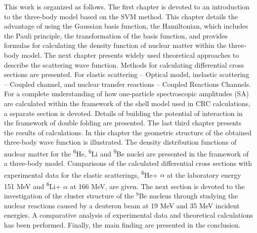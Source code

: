 \documentclass[
12pt, %
oneside, %
english, %
onehalfspacing, %
onehalfspacing, %
headsepline, %
]{MastersDoctoralThesis} %
\newcommand{\he}{\textsuperscript{6}He\xspace}
\newcommand{\li}{\textsuperscript{6}Li\xspace}
\newcommand{\be}{\textsuperscript{9}Be\xspace}
\begin{document}
This work is organized as follows. The first chapter is devoted to an introduction to the three-body model based on the SVM method. This chapter details the advantage of using the Gaussian basis function, the Hamiltonian, which includes the Pauli principle, the transformation of the basis function, and provides formulas for calculating the density function of nuclear matter within the three-body model. 
The next chapter presents widely used theoretical approaches to describe the scattering wave function. 
Methods for calculating differential cross sections  are presented. For elastic scattering -- Optical model, inelastic scattering -- Coupled channel, and nuclear transfer reactions -- Coupled Reactions Channels. 
For a complete understanding of how one-particle spectroscopic amplitudes (SA) are calculated within the framework of the shell model used in CRC calculations, a separate section is devoted.
Details of building the potential of interaction in the framework of double folding are presented.
The last third chapter presents the results of calculations. 
In this chapter the geometric structure of the obtained three-body wave function is illustrated. 
The density distribution functions of nuclear matter for the \he, \li and \be nuclei are presented in the framework of a three-body model. 
Comparisons of the calculated differential cross sections with experimental data for the elastic scatterings, \he + $\alpha$ at the laboratory energy 151 MeV  and \li + $\alpha$ at 166 MeV, are given. 
The next section is devoted to the investigation of the cluster structure of the ${}^9$Be nucleus through studying the nuclear reactions caused by a deuteron beam at 19 MeV and 35 MeV incident energies. 
A comparative analysis of experimental data and theoretical calculations has been performed.
Finally, the main finding are presented in the conclusion.
\end{document}
